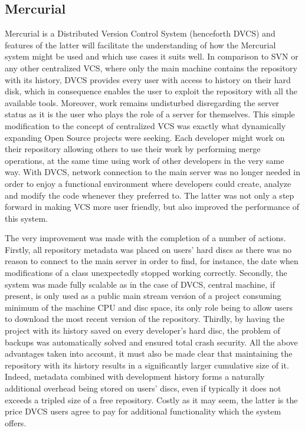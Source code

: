 \subsection{Mercurial}\label{subsec:hg}
Mercurial is a Distributed Version Control System (henceforth DVCS) and features of the latter will facilitate the understanding of how the Mercurial system might be used and which use cases it suits well. In comparison to SVN or any other centralized VCS, where only the main machine contains the repository with its history, DVCS provides every user with access to history on their hard disk, which in consequence enables the user to exploit the repository with all the available tools. Moreover, work remains undisturbed disregarding the server status as it is the user who plays the role of a server for themselves. This simple modification to the concept of centralized VCS was exactly what dynamically expanding Open Source projects were seeking. Each developer might work on their repository allowing others to use their work by performing merge operations, at the same time using work of other developers in the very same way. With DVCS, network connection to the main server was no longer needed in order to enjoy a functional environment where developers could create, analyze and modify the code whenever they preferred to. The latter was not only a step forward in making VCS more user friendly, but also improved the performance of this system. 

The very improvement was made with the completion of a number of actions. Firstly, all repository metadata was placed on users' hard discs as there was no reason to connect to the main server in order to find, for instance, the date when modifications of a class unexpectedly stopped working correctly. Secondly, the system was made fully scalable as in the case of DVCS, central machine, if present, is only used as a public main stream version of a project consuming minimum of the machine CPU and disc space, its only role being to allow users to download the most recent version of the repository. Thirdly, by having the project with its history saved on every developer's hard disc, the problem of backups was automatically solved and ensured total crash security. All the above advantages taken into account, it must also be made clear that  maintaining the repository with its history results in a significantly larger cumulative size of it. Indeed, metadata combined with development history forms a naturally additional overhead being stored on users' discs, even if typically it does not exceeds a tripled size of a free repository. Costly as it may seem, the latter is the price DVCS users agree to pay for additional functionality which the  system offers. 


